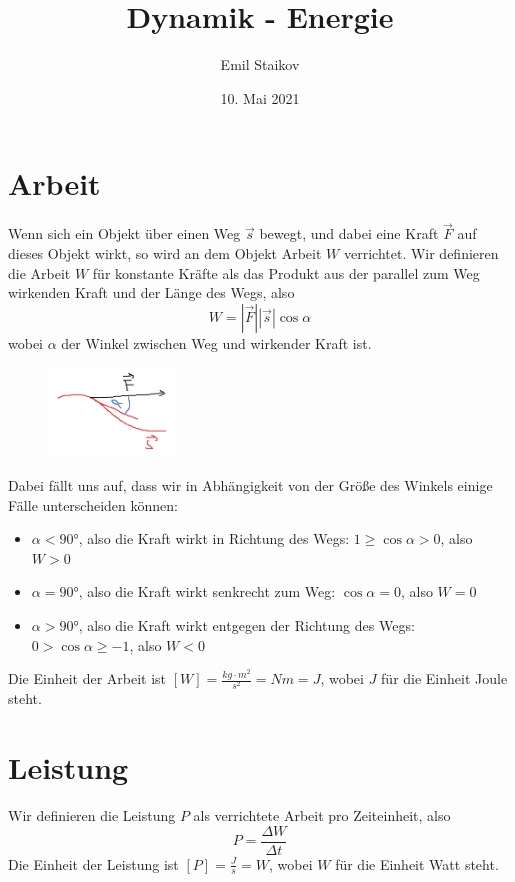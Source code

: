 \documentclass[11pt]{article}
\title{Dynamik - Energie}
\author{Emil Staikov}
\date{10. Mai 2021}
\begin{document}
\maketitle

\section{Arbeit}
Wenn sich ein Objekt über einen Weg $\vec{s}$ bewegt, und dabei eine Kraft $\vec{F}$ auf dieses Objekt wirkt, so wird an dem Objekt Arbeit $W$ verrichtet. Wir definieren die Arbeit $W$ für konstante Kräfte als das Produkt aus der parallel zum Weg wirkenden Kraft und der Länge des Wegs, also 
\begin{equation*}
    W = |\vec{F}||\vec{s}|\cos \alpha
\end{equation*}
wobei $\alpha$ der Winkel zwischen Weg und wirkender Kraft ist.
\begin{figure}[H]
    \centering
    \includegraphics[width=0.3\textwidth]{arbeit-def.png}
\end{figure}
Dabei fällt uns auf, dass wir in Abhängigkeit von der Größe des Winkels einige Fälle unterscheiden können: 
\begin{itemize}
    \item $\alpha < 90$°, also die Kraft wirkt in Richtung des Wegs: $1 \geq \cos\alpha > 0$, also $W > 0$
    \item $\alpha = 90$°, also die Kraft wirkt senkrecht zum Weg: $\cos\alpha = 0$, also $W = 0$
    \item $\alpha > 90$°, also die Kraft wirkt entgegen der Richtung des Wegs: $0 > \cos\alpha \geq -1$, also $W < 0$
\end{itemize}
Die Einheit der Arbeit ist $[W] = \frac{kg\cdot m^2}{s^2} = Nm = J$, wobei $J$ für die Einheit Joule steht. 

\section{Leistung}
Wir definieren die Leistung $P$ als verrichtete Arbeit pro Zeiteinheit, also 
\begin{equation*}
    P = \frac{\Delta W}{\Delta t}
\end{equation*}
Die Einheit der Leistung ist $[P] = \frac{J}{s} = W$, wobei $W$ für die Einheit Watt steht. 
\end{document}
